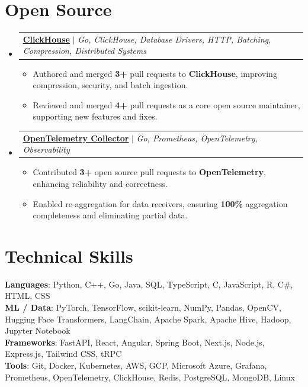 \documentclass[letterpaper,11pt]{article}
\makeatletter
\newcommand{\resumeItem}[1]{
  \item\small{
    {#1 \vspace{-2pt}}
  }
}
\newcommand{\resumeProjectHeading}[2]{
    \item
    \begin{tabular*}{0.97\textwidth}[t]{l@{\extracolsep{\fill}}r}
      \small#1\\
    \end{tabular*}\vspace{-7pt}
}
\newcommand{\resumeSubHeadingListStart}{\begin{itemize}[leftmargin=0.15in, label={}]}
\newcommand{\resumeSubHeadingListEnd}{\end{itemize}}
\newcommand{\resumeItemListStart}{\begin{itemize}}
\newcommand{\resumeItemListEnd}{\end{itemize}\vspace{-7pt}}
\makeatother
\begin{document}
\section{Open Source}
  \resumeSubHeadingListStart
    \resumeProjectHeading
      {\textbf{\href{https://github.com/ClickHouse/clickhouse-go}{\ul{ClickHouse}}} $|$ \emph{Go, ClickHouse, Database Drivers, HTTP, Batching, Compression, Distributed Systems}}{June 2021 -- Present}
      \resumeItemListStart
        \resumeItem{Authored and merged \textbf{3+} pull requests to \textbf{ClickHouse}, improving compression, security, and batch ingestion.}
        \resumeItem{Reviewed and merged \textbf{4+} pull requests as a core open source maintainer, supporting new features and fixes.}
      \resumeItemListEnd
    \resumeProjectHeading
      {\textbf{\href{https://github.com/open-telemetry/opentelemetry-collector-contrib}{\underline{OpenTelemetry Collector}}} $|$ \emph{Go, Prometheus, OpenTelemetry, Observability}}{June 2021 -- Present}
      \resumeItemListStart
        \resumeItem{Contributed \textbf{3+} open source pull requests to \textbf{OpenTelemetry}, enhancing reliability and correctness.}
        \resumeItem{Enabled re-aggregation for data receivers, ensuring \textbf{100\%} aggregation completeness and eliminating partial data.}
      \resumeItemListEnd
  \resumeSubHeadingListEnd

\section{Technical Skills}
 \begin{itemize}[leftmargin=0.15in, label={}]
    \small{\item{
     \textbf{Languages}{: Python, C++, Go, Java, SQL, TypeScript, C, JavaScript, R, C\#, HTML, CSS} \\
     \textbf{ML / Data}{: PyTorch, TensorFlow, scikit-learn, NumPy, Pandas, OpenCV, Hugging Face Transformers, LangChain, Apache Spark, Apache Hive, Hadoop, Jupyter Notebook} \\
     \textbf{Frameworks}{: FastAPI, React, Angular, Spring Boot, Next.js, Node.js, Express.js, Tailwind CSS, tRPC} \\
     \textbf{Tools}{: Git, Docker, Kubernetes, AWS, GCP, Microsoft Azure, Grafana, Prometheus, OpenTelemetry, ClickHouse, Redis, PostgreSQL, MongoDB, Linux} \\
    }}
 \end{itemize}
\end{document}
